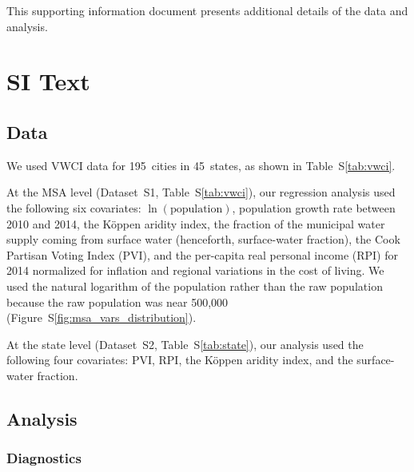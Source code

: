 \documentclass[draft]{agujournal}
\begin{document}
This supporting information document presents additional details of the data and analysis.

\section*{SI Text}

\subsection*{Data}
We used VWCI data for 195~cities in 45~states, as shown in Table~S\ref{tab:vwci}.

At the MSA level (Dataset~S1, Table~S\ref{tab:vwci}), our regression analysis used the following six covariates: $\ln(\text{population})$, population growth rate between 2010 and 2014, the K\"oppen aridity index, the fraction of the municipal water supply coming from surface water (henceforth, surface-water fraction), the Cook Partisan Voting Index (PVI), and the per-capita real personal income (RPI) for 2014 normalized for inflation and regional variations in the cost of living. We used the natural logarithm of the population rather than the raw population because the raw population was
 near 500,000%
(Figure~S\ref{fig:msa_vars_distribution}).

At the state level (Dataset~S2, Table~S\ref{tab:state}), our analysis used the following four covariates: PVI, RPI, the K\"oppen aridity index, and the surface-water fraction.



\subsection*{Analysis}

\subsubsection*{Diagnostics}

\iftrue
{}%
%
\end{document}
